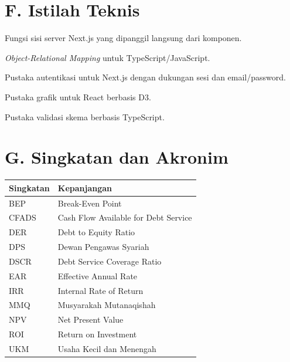 \documentclass[12pt,a4paper,twoside]{report}
\begin{document}
\section*{F. Istilah Teknis}

\begin{description}[style=unboxed,leftmargin=2.5cm]
  \item[Server Action] Fungsi sisi server Next.js yang dipanggil langsung dari komponen.
  \item[Drizzle ORM] \emph{Object-Relational Mapping} untuk TypeScript/JavaScript.
  \item[Better Auth] Pustaka autentikasi untuk Next.js dengan dukungan sesi dan email/password.
  \item[Recharts] Pustaka grafik untuk React berbasis D3.
  \item[Zod] Pustaka validasi skema berbasis TypeScript.
\end{description}

\section*{G. Singkatan dan Akronim}

\begin{longtable}{@{}p{3cm}>{\raggedright\arraybackslash}p{11cm}@{}}
\toprule
\textbf{Singkatan} & \textbf{Kepanjangan} \\
\midrule
\endhead
BEP & Break-Even Point \\
CFADS & Cash Flow Available for Debt Service \\
DER & Debt to Equity Ratio \\
DPS & Dewan Pengawas Syariah \\
DSCR & Debt Service Coverage Ratio \\
EAR & Effective Annual Rate \\
IRR & Internal Rate of Return \\
MMQ & Musyarakah Mutanaqishah \\
NPV & Net Present Value \\
ROI & Return on Investment \\
UKM & Usaha Kecil dan Menengah \\
\bottomrule
\end{longtable}
\end{document}
